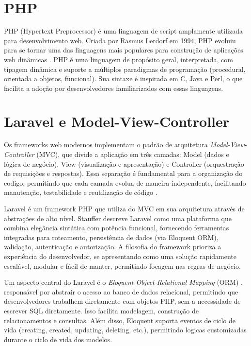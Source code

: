 \section{PHP}
\label{sec:revbib:php}
PHP (Hypertext Preprocessor) é uma linguagem de script amplamente utilizada para desenvolvimento web.
Criada por Rasmus Lerdorf em 1994, PHP evoluiu para se tornar uma das linguagens mais populares para
construção de aplicações web dinâmicas \cite{PHP2024}. PHP é uma linguagem de propósito geral, interpretada,
com tipagem dinâmica e suporte a múltiplos paradigmas de programação (procedural, orientada a objetos, funcional).
Sua sintaxe é inspirada em C, Java e Perl, o que facilita a adoção por desenvolvedores familiarizados com essas linguagens.


\section{Laravel e Model-View-Controller}
\label{sec:revbib:mvc}

Os frameworks web modernos implementam o padrão de arquitetura
\textit{Model-View-Controller} (MVC), que divide a aplicação em três camadas:
 Model (dados e lógica de negócio), View (visualização e apresentação) e Controller
(orquestração de requisições e respostas). Essa separação é fundamental para a organização do codigo,
permitindo que cada camada evolua de maneira independente, facilitando manutenção,
testabilidade e reutilização de código \cite{Sommerville2011}.

Laravel \cite{Laravel2024} é um framework PHP que utiliza do MVC em sua arquitetura
através de abstrações de alto nível. Stauffer \cite{CodingStyle2019} descreve
Laravel como uma plataforma que combina elegância sintática com potência
funcional, fornecendo ferramentas integradas para roteamento, persistência de
dados (via Eloquent ORM), validação, autenticação e autorização. A filosofia
do framework prioriza a experiência do desenvolvedor, se apresentando como uma solução rapidamente escalável, modular e fácil de manter,
permitindo focagem nas regras de negócio.

Um aspecto central do Laravel é o \textit{Eloquent Object-Relational Mapping}
(ORM) \cite{LaravelDocs2024}, responsável por abstrair o acesso ao banco de dados relacional,
permitindo que desenvolvedores trabalhem diretamente com objetos PHP, sem a necessidade de escrever SQL diretamente.
Isso facilita modelagem, construção de relacionamentos e consultas. Além disso, Eloquent suporta eventos
de ciclo de vida (creating, created, updating, deleting, etc.), permitindo logicas customizadas durante o ciclo de vida dos modelos.

